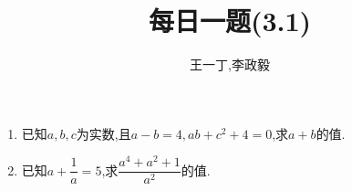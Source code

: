 \documentclass[UTF8]{ctexart}
\title{每日一题(3.1)}
\author{王一丁,李政毅}
\begin{document}
\maketitle
\begin{enumerate}
\item 已知$a,b,c$为实数,且$a-b=4,ab+c^2+4=0$,求$a+b$的值.\\
\item 已知$a+\dfrac{1}{a}=5$,求$\dfrac{a^4+a^2+1}{a^2}$的值.\\
\end{enumerate}
\end{document}
